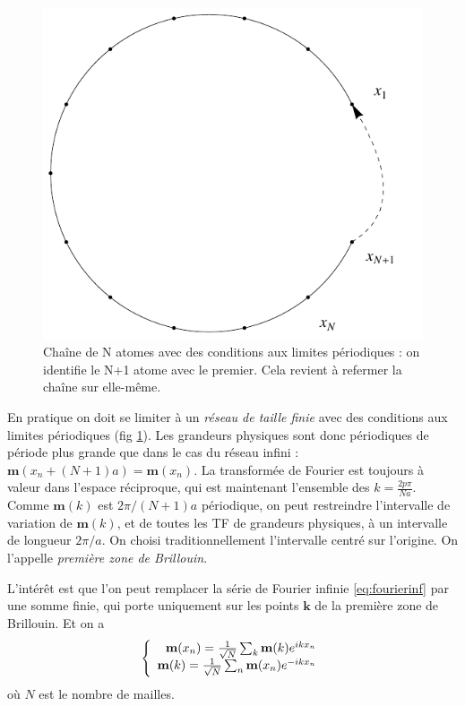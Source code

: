 \documentclass[a4paper, french]{report}
\newcommand{\ond}{\ensuremath{\mathbf{k}\xspace}}
\newcommand{\M}[1]{\ensuremath{\mathbf{m}(#1)}\xspace}
\newcommand{\1}{\ensuremath{\ket{\om_1\bom_1}}\xspace}
\newcommand{\2}{\ensuremath{\ket{\om_2\bom_2}}\xspace}
\begin{document}
\begin{figure}[htp]
\centering
\includegraphics[scale=1]{vector_img/clp.pdf}
\caption{Chaîne de N atomes avec des conditions aux limites périodiques : on identifie le N+1 atome avec le premier. Cela revient à refermer la chaîne sur elle-même.}
\label{fig:clp}
\end{figure}

En pratique on doit se limiter à un \emph{réseau de taille finie} avec des conditions aux limites périodiques (fig \ref{fig:clp}).
Les grandeurs physiques sont donc périodiques de période plus grande que dans le cas du réseau infini : $\M{x_n+(N+1)a}=\M{x_n}$.
La transformée de Fourier est toujours à valeur dans l'espace réciproque, qui est maintenant l'ensemble des $k=\frac{2p\pi}{Na}$. 
Comme \M{k} est $2\pi/(N+1)a$ périodique, on peut restreindre l'intervalle de variation de \M{k}, et de toutes les TF de grandeurs physiques, à un intervalle de longueur $2\pi/a$. On choisi traditionnellement l'intervalle centré sur l'origine. On l'appelle \emph{première zone de Brillouin}.

L'intérêt est que l'on peut remplacer la série de Fourier infinie \ref{eq:fourierinf} par une somme finie, qui porte uniquement sur les points $\ond$ de la première zone de Brillouin. Et on a
\begin{equation}
\left\{
	\begin{array}{r c l}
		\M{x_n}=\frac{1}{\sqrt{N}}\sum_{k}\M{k}e^{ikx_n}\\
		\M{k}=\frac{1}{\sqrt{N}}\sum_n\M{x_n}e^{-ikx_n}
	\end{array}
\right.
\end{equation}
où $N$ est le nombre de mailles.
\end{document}
